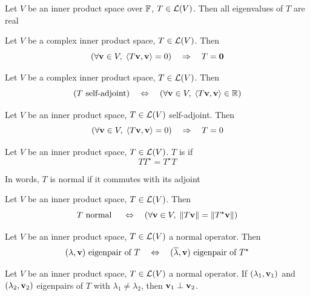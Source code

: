 \documentclass[aspectratio=169]{beamer}
\begin{document}
\begin{frame}
\begin{importanttheorem}
Let $V$ be an inner product space over $\mathbb{F}$, $T\in\mathcal{L}(V)$. Then all eigenvalues of $T$ are real
\end{importanttheorem}

\begin{importanttheorem}
Let $V$ be a complex inner product space, $T\in\mathcal{L}(V)$. Then
\[
\left(\forall\bv\in V,\; \langle T\bv,\bv\rangle =0\right)
\quad\Rightarrow\quad T=\b0
\]
\end{importanttheorem}

\begin{importanttheorem}
Let $V$ be a complex inner product space, $T\in\mathcal{L}(V)$. Then
\[
(T\textrm{ self-adjoint}) 
\quad\Leftrightarrow\quad
(\forall \mathbf{v}\in V,\;\langle T\mathbf{v},\mathbf{v}\rangle \in\mathbb{R})
\]
\end{importanttheorem}
\end{frame}

\begin{frame}
\begin{importanttheorem}
Let $V$ be an inner product space, $T\in\mathcal{L}(V)$ self-adjoint. Then
\[
(\forall \mathbf{v}\in V,\; \langle T\mathbf{v},\mathbf{v}\rangle =0)
\quad\Rightarrow\quad
T=0
\]
\end{importanttheorem}
\end{frame}

\begin{frame}
\begin{definition}
Let $V$ be an inner product space, $T\in\mathcal{L}(V)$. $T$ is  if
\[
TT^\star =T^\star T
\]
\end{definition}

In words, $T$ is normal if it commutes with its adjoint
\vfill
\begin{importanttheorem}[$T$ normal $\Leftrightarrow$ $\|T\bv\|=\|T^\star\bv\|$]
Let $V$ be an inner product space, $T\in\mathcal{L}(V)$.  Then
\[
T\textrm{ normal } \quad\Leftrightarrow\quad
(\forall\mathbf{v}\in V,\; \|T\mathbf{v}\|=\|T^\star\mathbf{v}\|)
\]
\end{importanttheorem}
\end{frame}

\begin{frame}
\begin{importanttheorem}
Let $V$ be an inner product space, $T\in\mathcal{L}(V)$ a normal operator. Then
\[
(\lambda,\mathbf{v})\textrm{ eigenpair of }T
\quad\Leftrightarrow\quad 
(\overline{\lambda},\mathbf{v})\textrm{ eigenpair of }T^\star 
\]
\end{importanttheorem}
\vfill
\begin{importanttheorem}
Let $V$ be an inner product space, $T\in\mathcal{L}(V)$ a normal operator.
If $(\lambda_1,\mathbf{v}_1)$ and $(\lambda_2,\mathbf{v}_2)$ eigenpairs of $T$ with $\lambda_1\neq\lambda_2$, then $\mathbf{v}_1\perp\mathbf{v}_2$.
\end{importanttheorem}
\end{frame}
\end{document}

